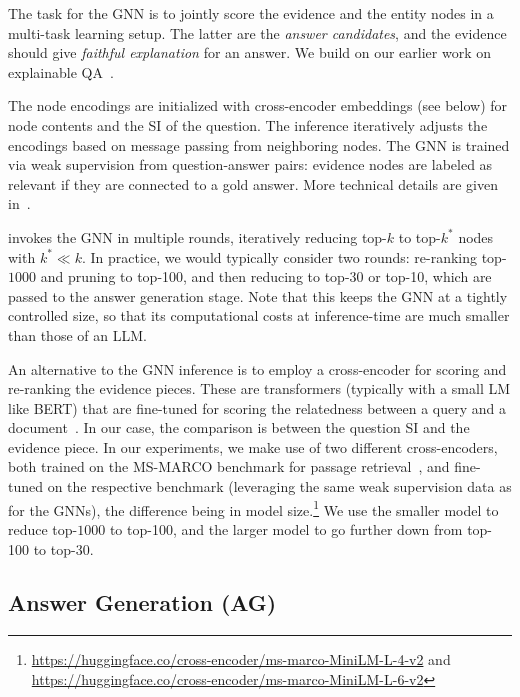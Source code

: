 The task for the GNN is to jointly score the evidence and the entity nodes in a multi-task learning setup. The latter are the {\em answer candidates}, and the evidence should give {\em faithful explanation} for an answer.
We build on our earlier work on explainable QA~\cite{Christmann-Explaignn:SIGIR2023}.

The node encodings are initialized with cross-encoder embeddings (see below) 
for node contents and the SI of the question. The inference iteratively adjusts the encodings based on message passing from neighboring nodes.
The GNN is trained via weak supervision from question-answer pairs:
evidence nodes are labeled as relevant if they are connected to
a gold answer.
More technical details are given in~\cite{Christmann-Explaignn:SIGIR2023}.

\method invokes the GNN in multiple rounds, iteratively reducing top-$k$ to top-$k^*$ nodes with $k^* \ll k$. In practice, we would typically consider two rounds: re-ranking top-$1000$ and pruning to top-100, and then reducing to top-30 or top-10, which are passed to the answer generation stage.
Note that this keeps the GNN at a tightly controlled size, so that its computational costs at inference-time are much smaller than those of an LLM.


An alternative to the GNN inference is to employ a cross-encoder for scoring and re-ranking the evidence pieces.
These are transformers (typically with a small LM like BERT) that are fine-tuned for scoring the relatedness between a query and a document~\cite{Nogueira:arxiv2019}. In our case, the comparison is between the question SI and the evidence piece. In our experiments, we make use of two different cross-encoders, 
both trained on the MS-MARCO benchmark for passage retrieval~\cite{Bajaj:arxiv2018}, 
and fine-tuned on the respective benchmark (leveraging the same weak supervision data as for the GNNs),
the difference being in model size.\footnote{\url{https://huggingface.co/cross-encoder/ms-marco-MiniLM-L-4-v2} and\\ \url{https://huggingface.co/cross-encoder/ms-marco-MiniLM-L-6-v2}}
We use the smaller model to reduce top-$1000$ to top-100, and the larger model to go further down from top-100 to top-30.





\subsection{Answer Generation (AG)}

